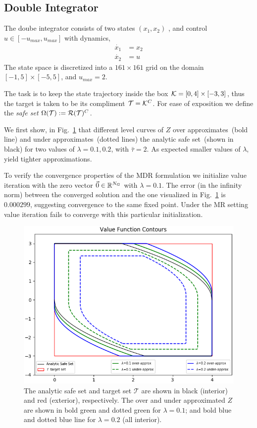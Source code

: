 \subsection{Double Integrator}
The doube integrator consists of two states $(x_1, x_2)$ , and  control $u \in [-u_{max}, u_{max}]$ with dynamics,
\begin{equation}
\begin{split}
\dot{x_1} & = x_2 \\
\dot{x_2} & = u 
\end{split}
\end{equation}
\noindent The state space is discretized into a $161 \times 161$ grid on the domain $[-1,5] \times [-5,5]$, and $u_{max}=2$.

The task is to keep the state trajectory inside the box $\mathcal{K} = [0,4] \times [-3,3]$, thus the target is taken to be its compliment $\mathcal{T}=\mathcal{K}^C$. For ease of exposition we define the \emph{safe set} $\Omega(\mathcal{T}) := \mathcal{R}(\mathcal{T})^C$.

We first show, in Fig.~\ref{fig:convergence} that different level curves of $Z$ over approximates~(bold line) and under approximates~(dotted lines) the analytic safe set~(shown in black) for two values of $\lambda = 0.1, 0.2$, with $\bar{\tau}=2$. As expected smaller values of $\lambda$, yield tighter approximations. 

To verify the convergence properties of the MDR formulation we initialize value iteration with the zero vector $\vec{0}\in \mathbb{R}^{N_G}$ with $\lambda=0.1$. The error (in the infinity norm) between the converged solution and the one visualized in Fig.~\ref{fig:convergence} is $0.000299$, suggesting convergence to the same fixed point. Under the MR setting value iteration fails to converge with this particular initialization.

\begin{figure}
\includegraphics[scale=0.5]{convergence_difflambda.png}
\caption{The analytic safe set and target set $\mathcal{T}$ are shown in black (interior) and red (exterior), respectively. The over and under approximated $Z$ are shown in bold green and dotted green for $\lambda=0.1$; and bold blue and dotted blue line for $\lambda  = 0.2$ (all interior).}
\label{fig:convergence}
\end{figure}


